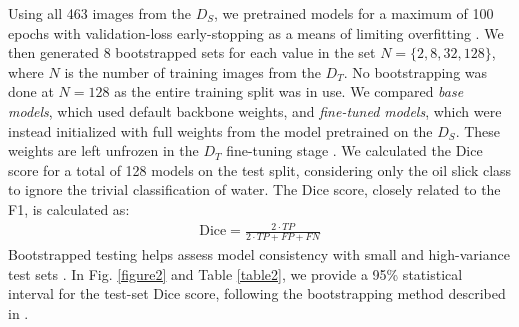 \documentclass[lettersize,journal]{IEEEtran}
\begin{document}
Using all 463 images from the $\mathit{D}_S$, we pretrained models for a maximum of 100 epochs with validation-loss early-stopping as a means of limiting overfitting \cite{wangGeneralizingFewExamples2020}. 
We then generated 8 bootstrapped sets for each value in the set \( N = \{ 2, 8, 32, 128\} \), where \( N \) is the number of training images from the $\mathit{D}_T$. No bootstrapping was done at \( N = 128 \) 
as the entire training split was in use. We compared \textit{base models}, which used default backbone weights, and \textit{fine-tuned models}, which were instead initialized with full weights from the model 
pretrained on the $\mathit{D}_S$. These weights are left unfrozen in the $\mathit{D}_T$ fine-tuning stage \cite{yosinskiHowTransferableAre2014}. We calculated the Dice score for a total of 128 models on the test split, 
considering only the oil slick class to ignore the trivial classification of water. The Dice score, closely related to the F1, is calculated as:
\begin{align}
    \text{Dice} = \frac{2 \cdot TP}{2 \cdot TP + FP + FN}
\end{align}
Bootstrapped testing helps assess model consistency with small and high-variance test sets \cite{mollersenAccountingMultiplicityMachine2024}. In Fig. \ref{figure2} and Table \ref{table2},
we provide a 95\% statistical interval for the test-set Dice score, following the bootstrapping method described in
\cite{burkovMachineLearningEngineering2020}.
\end{document}

